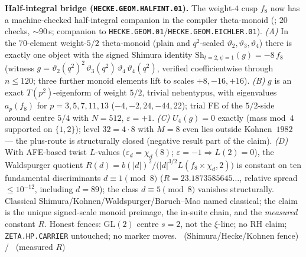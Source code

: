 \par\smallskip\noindent\textbf{Half-integral bridge
(\texttt{HECKE.GEOM.HALFINT.01}).}
The weight-$4$ cusp $f_8$ now has a machine-checked half-integral companion in the compiler
theta-monoid (; $20$ checks, $\sim90$\,s; companion to
\texttt{HECKE.GEOM.01}/\texttt{HECKE.GEOM.EICHLER.01}).
\emph{(A)} In the $70$-element weight-$5/2$ theta-monoid (plain and $q^2$-scaled
$\vartheta_2,\vartheta_3,\vartheta_4$) there is exactly one object with the signed Shimura
identity $\mathrm{Sh}_{t=2,\psi=1}(g)=-8\,f_8$ (witness
$g=\vartheta_2(q^2)^2\,\vartheta_3(q^2)\,\vartheta_4\,\vartheta_4(q^2)$, verified
coefficientwise through $n\le120$; three further monoid elements lift to scales
$+8,-16,+16$).
\emph{(B)} $g$ is an exact $T(p^2)$-eigenform of weight $5/2$, trivial nebentypus, with
eigenvalues $a_p(f_8)$ for $p=3,5,7,11,13$ ($-4,-2,24,-44,22$); trial FE of the
$5/2$-side around centre $5/4$ with $N=512$, $\varepsilon=+1$.
\emph{(C)} $U_4(g)=0$ exactly (mass mod~$4$ supported on $\{1,2\}$); level $32=4\cdot8$
with $M=8$ even lies outside Kohnen~$1982$ --- the plus-route is structurally closed
(negative result part of the claim).
\emph{(D)} With AFE-based twist $L$-values
($\varepsilon_d=\chi_d(8)$; $\varepsilon=-1\Rightarrow L(2)=0$), the Waldspurger quotient
$R(d)=b(|d|)^2\big/\bigl(|d|^{3/2}L(f_8\times\chi_d,2)\bigr)$ is constant on ten
fundamental discriminants $d\equiv1\pmod8$ ($R=23.1873585645\ldots$, relative spread
$\le10^{-12}$, including $d=89$); the class $d\equiv5\pmod8$ vanishes structurally.
Classical Shimura/Kohnen/Waldspurger/Baruch--Mao named classical; the claim is the unique
signed-scale monoid preimage, the in-suite chain, and the \emph{measured} constant $R$.
Honest fences: GL$(2)$ centre $s=2$, not the $\xi$-line; no RH claim;
\texttt{ZETA.HP.CARRIER} untouched; no marker moves.
\mE\ (Shimura/Hecke/Kohnen fence) / \mC\ (measured $R$)



